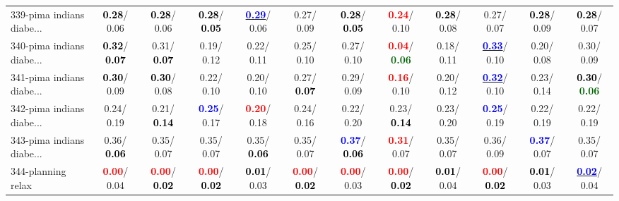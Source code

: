 \begin{table}[h]
\begin{center}
{\begin{tabular}{lc|c|c|c|c|c|c|c|c|c|c}
339-pima indians diabe... & \textcolor{black}{\textbf{  0.28}}/  0.06 & \textcolor{black}{\textbf{  0.28}}/  0.06 & \textcolor{black}{\textbf{  0.28}}/\textcolor{black}{\textbf{  0.05}} & \underline{\textcolor{blue}{\textbf{  0.29}}}/  0.06 &   0.27/  0.09 & \textcolor{black}{\textbf{  0.28}}/\textcolor{black}{\textbf{  0.05}} & \textcolor{red}{\textbf{  0.24}}/  0.10 & \textcolor{black}{\textbf{  0.28}}/  0.08 &   0.27/  0.07 & \textcolor{black}{\textbf{  0.28}}/  0.09 & \textcolor{black}{\textbf{  0.28}}/  0.07 \\
340-pima indians diabe... & \textcolor{black}{\textbf{  0.32}}/\textcolor{black}{\textbf{  0.07}} &   0.31/\textcolor{black}{\textbf{  0.07}} &   0.19/  0.12 &   0.22/  0.11 &   0.25/  0.10 &   0.27/  0.10 & \textcolor{red}{\textbf{  0.04}}/\textcolor{darkgreen}{\textbf{  0.06}} &   0.18/  0.11 & \underline{\textcolor{blue}{\textbf{  0.33}}}/  0.10 &   0.20/  0.08 &   0.30/  0.09 \\
341-pima indians diabe... & \textcolor{black}{\textbf{  0.30}}/  0.09 & \textcolor{black}{\textbf{  0.30}}/  0.08 &   0.22/  0.10 &   0.20/  0.10 &   0.27/\textcolor{black}{\textbf{  0.07}} &   0.29/  0.09 & \textcolor{red}{\textbf{  0.16}}/  0.10 &   0.20/  0.12 & \underline{\textcolor{blue}{\textbf{  0.32}}}/  0.10 &   0.23/  0.14 & \textcolor{black}{\textbf{  0.30}}/\textcolor{darkgreen}{\textbf{  0.06}} \\ \hline
342-pima indians diabe... &   0.24/  0.19 &   0.21/\textcolor{black}{\textbf{  0.14}} & \textcolor{blue}{\textbf{  0.25}}/  0.17 & \textcolor{red}{\textbf{  0.20}}/  0.18 &   0.24/  0.16 &   0.22/  0.20 &   0.23/\textcolor{black}{\textbf{  0.14}} &   0.23/  0.20 & \textcolor{blue}{\textbf{  0.25}}/  0.19 &   0.22/  0.19 &   0.22/  0.19 \\
343-pima indians diabe... &   0.36/\textcolor{black}{\textbf{  0.06}} &   0.35/  0.07 &   0.35/  0.07 &   0.35/\textcolor{black}{\textbf{  0.06}} &   0.35/  0.07 & \textcolor{blue}{\textbf{  0.37}}/\textcolor{black}{\textbf{  0.06}} & \textcolor{red}{\textbf{  0.31}}/  0.07 &   0.35/  0.07 &   0.36/  0.09 & \textcolor{blue}{\textbf{  0.37}}/  0.07 &   0.35/  0.07 \\
344-planning relax & \textcolor{red}{\textbf{  0.00}}/  0.04 & \textcolor{red}{\textbf{  0.00}}/\textcolor{black}{\textbf{  0.02}} & \textcolor{red}{\textbf{  0.00}}/\textcolor{black}{\textbf{  0.02}} & \textcolor{black}{\textbf{  0.01}}/  0.03 & \textcolor{red}{\textbf{  0.00}}/\textcolor{black}{\textbf{  0.02}} & \textcolor{red}{\textbf{  0.00}}/  0.03 & \textcolor{red}{\textbf{  0.00}}/\textcolor{black}{\textbf{  0.02}} & \textcolor{black}{\textbf{  0.01}}/  0.04 & \textcolor{red}{\textbf{  0.00}}/\textcolor{black}{\textbf{  0.02}} & \textcolor{black}{\textbf{  0.01}}/  0.03 & \underline{\textcolor{blue}{\textbf{  0.02}}}/  0.04 \\

\end{tabular}}
\end{center}
\end{table}
